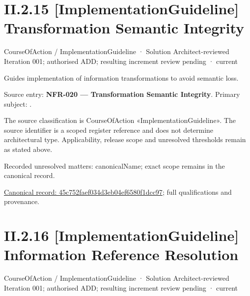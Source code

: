 \section*{II.2.15 [ImplementationGuideline] Transformation Semantic Integrity}
\label{navigation:II.2.15}

\label{element:45c752faef034d3eb04ef6580f1dcc97}
{\small CourseOfAction / ImplementationGuideline · Solution Architect-reviewed Iteration 001; authorised ADD; resulting increment review pending · current}\par

Guides implementation of information transformations to avoid semantic loss.



Source entry: \textbf{NFR-020 — Transformation Semantic Integrity}. Primary subject: \texttt{}.



The source classification is CourseOfAction «ImplementationGuideline». The source identifier is a scoped register reference and does not determine architectural type. Applicability, release scope and unresolved thresholds remain as stated above.


{\small Recorded unresolved matters: canonicalName; exact scope remains in the canonical record.}\par
{\footnotesize \href{../../../../../../../continuum/strategy/course-of-action/implementation-guideline/45c752faef034d3eb04ef6580f1dcc97.md}{Canonical record: 45c752faef034d3eb04ef6580f1dcc97}; full qualifications and provenance.}\par
\section*{II.2.16 [ImplementationGuideline] Information Reference Resolution}
\label{navigation:II.2.16}

\label{element:b5c3dcfd6ece40fdb6c8694924db2ae6}
{\small CourseOfAction / ImplementationGuideline · Solution Architect-reviewed Iteration 001; authorised ADD; resulting increment review pending · current}\par

